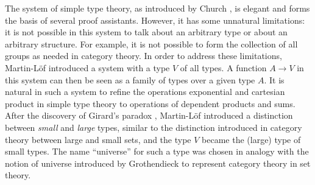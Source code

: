 \documentclass[11pt,a4paper]{article}
\theoremstyle{definition}
\newcommand{\ttt}[1]{\text{\tt #1}}
\begin{document}
The system of simple type theory,
as introduced by Church \cite{church:formulation},
is elegant and forms the basis of several proof assistants.
However, it has some unnatural limitations:
it is not possible in this system to talk
about an arbitrary type or about an arbitrary structure.
For example, it is not possible to form the collection of all groups
as needed in category theory. In order to address these limitations,
Martin-L\"of \cite{ML71,ML71a} introduced a system with a type $V$ of all types.
A function $A\rightarrow V$ in this system can then be seen as a family of types
over a given type $A$. It is natural in such a system to refine
the operations exponential and cartesian product in simple type theory
to operations of dependent products and sums.
After the discovery of Girard's paradox \cite{Girard71},
Martin-L\"of \cite{ML72} introduced a distinction between
{\em small} and {\em large} types, similar to the distinction introduced
in category theory between large and small sets,
and the type $V$ became the (large) type of small types.
The name ``universe'' for such a type was chosen in analogy with the notion of
universe introduced by Grothendieck to represent category theory in set theory.

\end{document}
